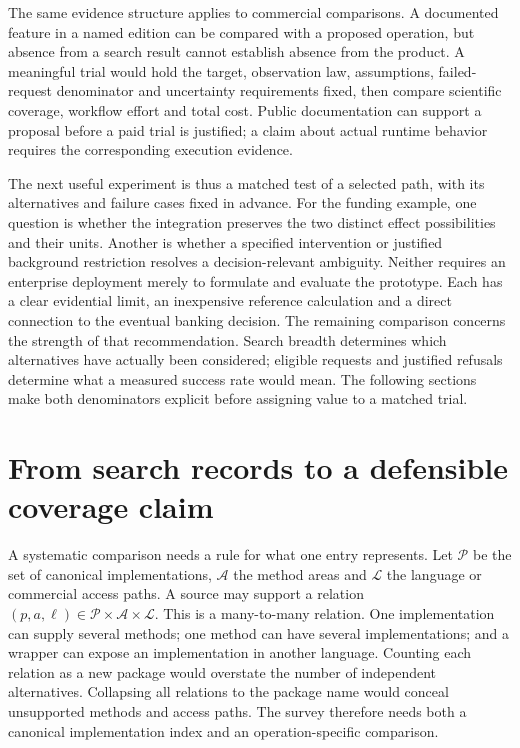 The same evidence structure applies to commercial comparisons. A documented
feature in a named edition can be compared with a proposed operation, but
absence from a search result cannot establish absence from the product.
A meaningful trial would hold the target, observation law, assumptions,
failed-request denominator and uncertainty requirements fixed, then compare
scientific coverage, workflow effort and total cost. Public documentation
can support a proposal before a paid trial is justified; a claim about
actual runtime behavior requires the corresponding execution evidence.

The next useful experiment is thus a matched test of a selected path, with
its alternatives and failure cases fixed in advance. For the funding example,
one question is whether the integration preserves the two distinct effect
possibilities and their units. Another is whether a specified intervention
or justified background restriction resolves a decision-relevant ambiguity.
Neither requires an enterprise deployment merely to formulate and evaluate
the prototype. Each has a clear evidential limit, an inexpensive reference
calculation and a direct connection to the eventual banking decision.
The remaining comparison concerns the strength of that recommendation.
Search breadth determines which alternatives have actually been considered;
eligible requests and justified refusals determine what a measured success
rate would mean. The following sections make both denominators explicit
before assigning value to a matched trial.
\label{exec13:survey-end}


\section{From search records to a defensible coverage claim}
\label{exec13:survey-coverage}

A systematic comparison needs a rule for what one entry represents. Let
$\mathcal P$ be the set of canonical implementations, $\mathcal A$ the method
areas and $\mathcal L$ the language or commercial access paths. A source may
support a relation $(p,a,\ell)\in\mathcal P\times\mathcal A\times\mathcal L$.
This is a many-to-many relation. One implementation can supply several methods;
one method can have several implementations; and a wrapper can expose an
implementation in another language. Counting each relation as a new package
would overstate the number of independent alternatives. Collapsing all
relations to the package name would conceal unsupported methods and access
paths. The survey therefore needs both a canonical implementation index and
an operation-specific comparison.


